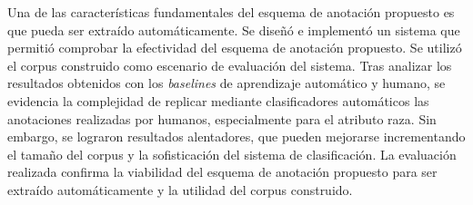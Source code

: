 \begin{conclusions}
    Una de las caracter\'isticas fundamentales del esquema de anotaci\'on propuesto es que pueda ser extra\'ido 
    autom\'aticamente. Se dise\~n\'o e implement\'o un sistema que permiti\'o comprobar la efectividad del esquema 
    de anotaci\'on propuesto. Se utiliz\'o el corpus construido como escenario de evaluaci\'on del sistema. 
    Tras analizar los resultados obtenidos con los \emph{baselines} de aprendizaje autom\'atico y humano, se 
    evidencia la complejidad de replicar mediante clasificadores autom\'aticos las anotaciones realizadas por 
    humanos, especialmente para el atributo raza. Sin embargo, se lograron resultados alentadores, que pueden 
    mejorarse incrementando el tama\~no del corpus y la sofisticaci\'on del sistema de clasificaci\'on. La 
    evaluaci\'on realizada confirma la viabilidad del esquema de anotaci\'on propuesto para ser extra\'ido 
    autom\'aticamente y la utilidad del corpus construido.


\end{conclusions}
